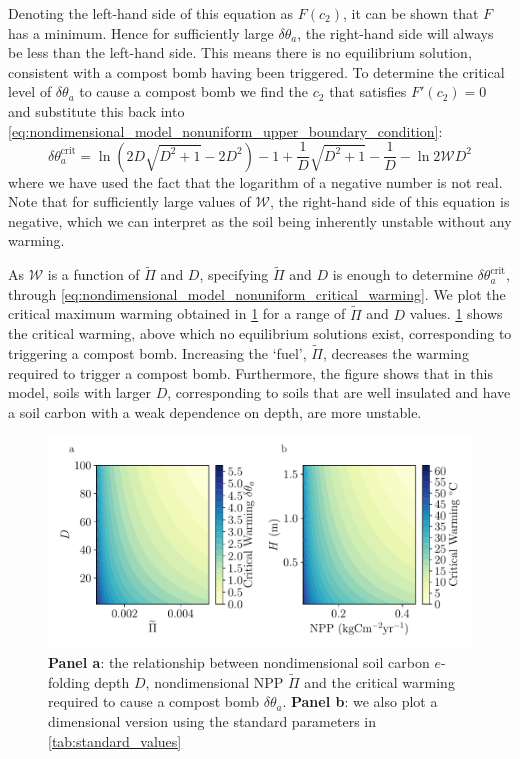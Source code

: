 Denoting the left-hand side of this equation as $F(c_2)$, it can be shown that $F$ has a minimum. Hence for sufficiently large $\delta\theta_a$, the right-hand side will always
be less than the left-hand side. This means there is no equilibrium solution, consistent with a compost bomb having been triggered. To determine the critical level of $\delta\theta_a$ to cause a compost bomb
we find the $c_2$ that satisfies $F'(c_2) = 0$ and substitute this back into \cref{eq:nondimensional_model_nonuniform_upper_boundary_condition}:
\begin{equation}
  \label{eq:nondimensional_model_nonuniform_critical_warming}
  \delta\theta_a^{\mathrm{crit}} = \ln \left(2D\sqrt{D^2 +1} - 2D^2\right) -1 + \frac{1}{D} \sqrt{D^2 + 1} - \frac{1}{D} - \ln 2\mathcal{W}D^2
\end{equation}
where we have used the fact that the logarithm of a negative number is not real.
Note that for sufficiently large values of $\mathcal{W}$, the right-hand side of this equation is negative, which we can interpret as the soil being inherently unstable without any warming.

As $\mathcal{W}$ is a function of $\widetilde{\Pi}$ and $D$, specifying $\widetilde{\Pi}$ and $D$ is enough to determine $\delta\theta_a^{\mathrm{crit}}$, through
\cref{eq:nondimensional_model_nonuniform_critical_warming}. We plot the critical maximum warming obtained in \cref{fig:critical_theta_a} for a range of $\widetilde{\Pi}$ and $D$ values.
\cref{fig:critical_theta_a} shows the critical warming, above which no equilibrium solutions exist, corresponding to triggering a compost bomb.
Increasing the `fuel', $\widetilde{\Pi}$, decreases the warming
required to trigger a compost bomb. Furthermore, the figure shows that in this model, soils with larger $D$, corresponding to soils that are well insulated and have a
soil carbon with a weak dependence on depth, are more unstable.
\begin{figure}
  \centering
  \includegraphics[keepaspectratio,scale=0.5]{static_dim_and_nondim}
  \caption[Critical warming to trigger a compost bomb]{\textbf{Panel a}: the relationship between nondimensional soil carbon $e$-folding depth $D$, nondimensional NPP $\widetilde{\Pi}$ and the critical warming required to cause a compost
    bomb $\delta\theta_a$. \textbf{Panel b}: we also plot a dimensional version using the standard parameters in \cref{tab:standard_values}}
  \label{fig:critical_theta_a}
\end{figure}


